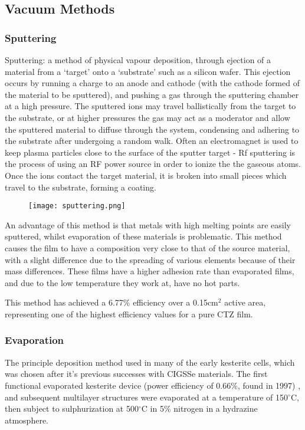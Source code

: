 \subsection{Vacuum Methods}
\subsubsection{Sputtering}
Sputtering: a method of physical vapour deposition, through ejection of a material from a `target' onto a `substrate' such as a silicon wafer. This ejection occurs by running a charge to an anode and cathode (with the cathode formed of the material to be sputtered), and pushing a gas through the sputtering chamber at a high pressure. The sputtered ions may travel ballistically from the target to the substrate, or at higher pressures the gas may act as a moderator and allow the sputtered material to diffuse through the system, condensing and adhering to the substrate after undergoing a random walk.
Often an electromagnet is used to keep plasma particles close to the surface of the sputter target - Rf sputtering is the process of using an RF power source in order to ionize the the gaseous atoms. Once the ions contact the target material, it is broken into small pieces which travel to the substrate, forming a coating.
\begin{figure}
\texttt{[image: sputtering.png]}\citep{_sputtering.gif_????}
\end{figure}
An advantage of this method is that metals with high melting points are easily sputtered, whilst evaporation of these materials is problematic. This method causes the film to have a composition very close to that of the source material, with a slight difference due to the spreading of various elements because of their mass differences. These films have a higher adhesion rate than evaporated films, and due to the low temperature they work at, have no hot parts.

This method has achieved a 6.77\% efficiency over a 0.15cm$^2$ active area, representing one of the highest efficiency values for a pure CTZ film. \citep{mitzi_path_2011}

\subsubsection{Evaporation}

The principle deposition method used in many of the early kesterite cells, which was chosen after it's previous successes with CIGSSe materials.
The first functional evaporated kesterite device (power efficiency of 0.66\%, found in 1997) , and subsequent multilayer structures were evaporated at a temperature of 150$^\circ$C, then subject to sulphurization at 500$^\circ$C in 5\% nitrogen in a hydrazine atmosphere.

